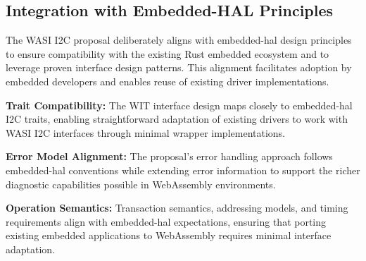 \subsection{Integration with Embedded-HAL Principles}
\label{subsec:i2c-embedded-hal-integration}

The WASI I2C proposal deliberately aligns with embedded-hal design principles to ensure compatibility with the existing Rust embedded ecosystem and to leverage proven interface design patterns. This alignment facilitates adoption by embedded developers and enables reuse of existing driver implementations.

\textbf{Trait Compatibility:} The WIT interface design maps closely to embedded-hal I2C traits, enabling straightforward adaptation of existing drivers to work with WASI I2C interfaces through minimal wrapper implementations.

\textbf{Error Model Alignment:} The proposal's error handling approach follows embedded-hal conventions while extending error information to support the richer diagnostic capabilities possible in WebAssembly environments.

\textbf{Operation Semantics:} Transaction semantics, addressing models, and timing requirements align with embedded-hal expectations, ensuring that porting existing embedded applications to WebAssembly requires minimal interface adaptation.